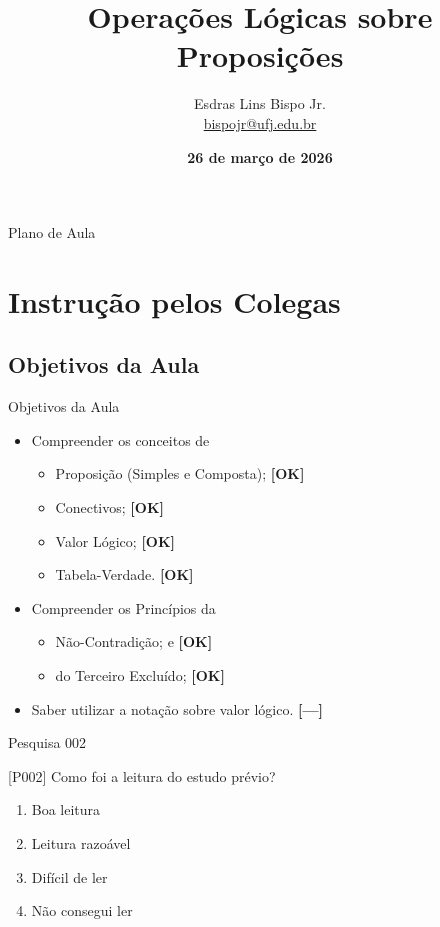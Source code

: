 \documentclass[xcolor=dvipsnames,table]{beamer}
\title{Operações Lógicas sobre Proposições}
\author{
  Esdras Lins Bispo Jr. \\ \url{bispojr@ufj.edu.br}
  }
\institute{
  Lógica para Ciência da Computação \\Bacharelado em Ciência da Computação}
\date{\textbf{26 de março de 2026} }
\begin{document}
	\begin{frame}
		\titlepage
	\end{frame}

	\AtBeginSection{
		\begin{frame}{Sumário}%
    		\tableofcontents[currentsection]
		\end{frame}
	}

	\begin{frame}{Plano de Aula}
		\tableofcontents
	\end{frame}
	
	\section{Instrução pelos Colegas}
	\subsection{Objetivos da Aula}
	\begin{frame}{Objetivos da Aula}
		\begin{itemize}
			\item Compreender os conceitos de
			\begin{itemize}[label=$\bullet$]
				\item Proposição (Simples e Composta); {\bf \color{blue} [OK]}
				\item Conectivos; {\bf \color{blue} [OK]}
				\item Valor Lógico; {\bf \color{blue} [OK]}
				\item Tabela-Verdade. {\bf \color{blue} [OK]}
			\end{itemize}
		\item Compreender os Princípios da 
			\begin{itemize}[label=$\bullet$]
				\item Não-Contradição; e {\bf \color{blue} [OK]}
				\item do Terceiro Excluído; {\bf \color{blue} [OK]}
			\end{itemize}
		\item Saber utilizar a notação sobre valor lógico. {\bf \color{yellow} [---]}
		\end{itemize}
	\end{frame}  

        \begin{frame}{Pesquisa 002}
		\begin{block}{[P002]}
			Como foi a leitura do estudo prévio?
		\end{block}
		\begin{enumerate}[label=(\Alph*)]
			\item Boa leitura
			\item Leitura razoável
			\item Difícil de ler
			\item Não consegui ler
		\end{enumerate}
	\end{frame}
\end{document}
